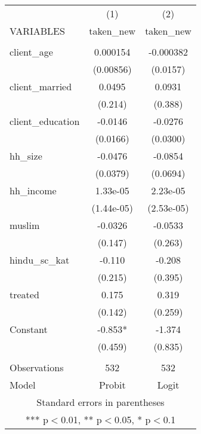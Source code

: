 \begin{tabular}{lcc} \hline
 & (1) & (2) \\
VARIABLES & taken\_new & taken\_new \\ \hline
 &  &  \\
client\_age & 0.000154 & -0.000382 \\
 & (0.00856) & (0.0157) \\
client\_married & 0.0495 & 0.0931 \\
 & (0.214) & (0.388) \\
client\_education & -0.0146 & -0.0276 \\
 & (0.0166) & (0.0300) \\
hh\_size & -0.0476 & -0.0854 \\
 & (0.0379) & (0.0694) \\
hh\_income & 1.33e-05 & 2.23e-05 \\
 & (1.44e-05) & (2.53e-05) \\
muslim & -0.0326 & -0.0533 \\
 & (0.147) & (0.263) \\
hindu\_sc\_kat & -0.110 & -0.208 \\
 & (0.215) & (0.395) \\
treated & 0.175 & 0.319 \\
 & (0.142) & (0.259) \\
Constant & -0.853* & -1.374 \\
 & (0.459) & (0.835) \\
 &  &  \\
Observations & 532 & 532 \\
 Model & Probit & Logit \\ \hline
\multicolumn{3}{c}{ Standard errors in parentheses} \\
\multicolumn{3}{c}{ *** p$<$0.01, ** p$<$0.05, * p$<$0.1} \\
\end{tabular}
